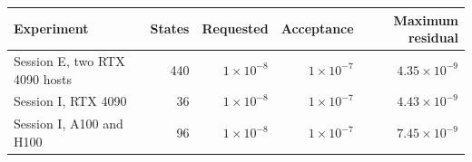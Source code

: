 \begin{tabular}{@{}lrrrr@{}}
\toprule
Experiment & States & Requested & Acceptance & Maximum residual \\
\midrule
Session E, two RTX 4090 hosts & 440 & $1\times10^{-8}$ & $1\times10^{-7}$ & $4.35\times10^{-9}$ \\
Session I, RTX 4090 & 36 & $1\times10^{-8}$ & $1\times10^{-7}$ & $4.43\times10^{-9}$ \\
Session I, A100 and H100 & 96 & $1\times10^{-8}$ & $1\times10^{-7}$ & $7.45\times10^{-9}$ \\
\bottomrule
\end{tabular}
